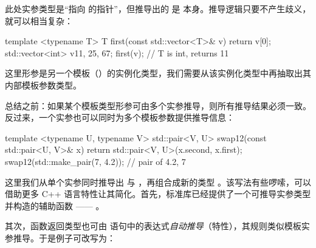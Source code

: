 此处实参类型是“指向  的指针”，但推导出的  是  本身。推导逻辑只要不产生歧义，就可以相当复杂：

\begin{code}
template <typename T> T first(const std::vector<T>& v) {
  return v[0];
}
std::vector<int> v{11, 25, 67};
first(v);    // T is int, returns 11
\end{code}

这里形参是另一个模板（）的实例化类型，我们需要从该实例化类型中再抽取出其内部模板参数类型。

总结之前：如果某个模板类型形参可由多个实参推导，则所有推导结果必须一致。反过来，一个实参也可以同时为多个模板参数提供推导信息：

\begin{code}
template <typename U, typename V>
std::pair<V, U> swap12(const std::pair<U, V>& x) {
  return std::pair<V, U>(x.second, x.first);
}
swap12(std::make_pair(7, 4.2)); // pair of 4.2, 7
\end{code}

这里我们从单个实参同时推导出  与 ，再组合成新的类型 。该写法有些啰嗦，可以借助更多 C++ 语言特性让其简化。首先，标准库已经提供了一个可推导实参类型并构造的辅助函数 —— 。

其次，函数返回类型也可由  语句中的表达式\emph{自动推导}（\cpp[14] 特性），其规则类似模板实参推导。于是例子可改写为：

